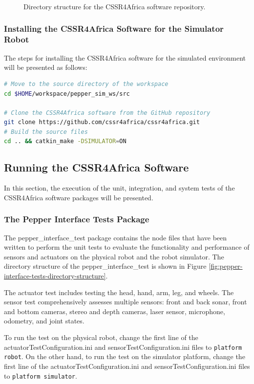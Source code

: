 \documentclass{CSSRforAfrica}
\begin{document}
{\begin{figure}[ht]
\caption{Directory structure for the CSSR4Africa software repository.}
\label{fig:pepper-robot-workspace-directory}
\end{figure}

\subsubsection{Installing the CSSR4Africa Software for the Simulator Robot}
\label{sim-soft}
The steps for installing the CSSR4Africa software for the simulated environment will be presented as follows:

\begin{lstlisting}[style=withoutNumbering, language=bash]
# Move to the source directory of the workspace
cd $HOME/workspace/pepper_sim_ws/src

# Clone the CSSR4Africa software from the GitHub repository
git clone https://github.com/cssr4africa/cssr4africa.git
# Build the source files
cd .. && catkin_make -DSIMULATOR=ON
\end{lstlisting}

\subsection{Running the CSSR4Africa Software}
In this section, the execution of the unit, integration, and system tests of the CSSR4Africa software packages will be presented.

\subsubsection{The Pepper Interface Tests Package}
The pepper\_interface\_test package contains the node files that have been written to perform the unit tests to evaluate the functionality and performance of sensors and actuators on the physical robot and the robot simulator. The directory structure of the pepper\_interface\_test is shown in Figure \ref{fig:pepper-interface-tests-directory-structure}.

The actuator test includes testing the head, hand, arm, leg, and wheels. The sensor test comprehensively assesses multiple sensors: front and back sonar, front and bottom cameras, stereo and depth cameras, laser sensor, microphone, odometry, and joint states.

\noindent To run the test on the physical robot, change the first line of the actuatorTestConfiguration.ini and sensorTestConfiguration.ini files to \texttt{platform robot}. On the other hand, to run the test on the simulator platform, change the first line of the actuatorTestConfiguration.ini and sensorTestConfiguration.ini files to \texttt{platform simulator}. 

}
\end{document}
